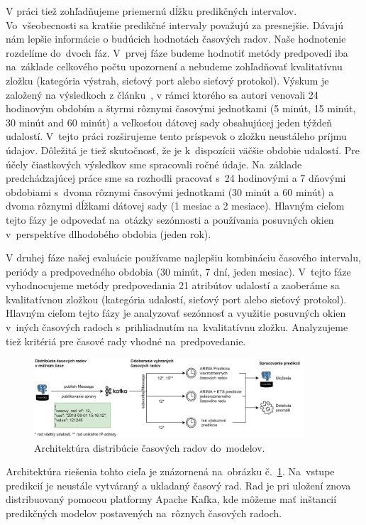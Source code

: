 \documentclass[thesismargins, thesislinespacing, openright, upjsfrontpage]{rnthesis}
\begin{document}
V práci tiež zohľadňujeme priemernú dĺžku predikčných intervalov. Vo~všeobecnosti sa kratšie predikčné intervaly považujú za presnejšie. Dávajú nám lepšie informácie o budúcich hodnotách časových radov. Naše hodnotenie rozdelíme do~dvoch fáz. V~prvej fáze budeme hodnotiť metódy predpovedí iba na~základe celkového počtu upozornení a nebudeme zohľadňovať kvalitatívnu zložku (kategória výstrah, sieťový port alebo sieťový protokol).  Výskum je založený na výsledkoch z článku~\cite{new_paper}, v rámci ktorého sa autori venovali 24 hodinovým obdobím a štyrmi rôznymi časovými jednotkami (5 minút, 15 minút, 30 minút and 60 minút) a veľkosťou dátovej sady obsahujúcej jeden týždeň udalostí. V~tejto práci rozširujeme tento príspevok o zložku neustáleho príjmu údajov. Dôležitá je tiež skutočnosť, že je k~dispozícii väčšie obdobie udalostí. Pre účely čiastkových výsledkov sme spracovali ročné údaje. Na~základe predchádzajúcej práce sme sa rozhodli pracovať s~24 hodinovými a 7 dňovými obdobiami s~dvoma rôznymi časovými jednotkami (30 minút a 60 minút) a dvoma rôznymi dĺžkami dátovej sady (1 mesiac a 2 mesiace). Hlavným cieľom tejto fázy je odpovedať na~otázky sezónnosti a používania posuvných okien v~perspektíve dlhodobého obdobia (jeden rok).

V druhej fáze našej evaluácie používame najlepšiu kombináciu časového intervalu, periódy a predpovedného obdobia (30 minút, 7 dní, jeden mesiac). V~tejto fáze vyhodnocujeme metódy predpovedania 21 atribútov udalostí a zaoberáme sa kvalitatívnou zložkou (kategória udalostí, sieťový port alebo sieťový protokol). Hlavným cieľom tejto fázy je analyzovať sezónnosť a využitie posuvných okien v~iných časových radoch s~prihliadnutím na~kvalitatívnu zložku. Analyzujeme tiež kritériá pre časové rady vhodné na~predpovedanie.

\begin{figure}[h]
  \centering
  \includegraphics[width=0.9\textwidth]{images/metodologia2.png}
  \caption{Architektúra distribúcie časových radov do~modelov.}
  \label{fig:c2_schema}
\end{figure}


Architektúra riešenia tohto cieľa je znázornená na~obrázku č.~\ref{fig:c2_schema}. Na~vstupe predikcií je neustále vytváraný a ukladaný časový rad. Rad je pri uložení znova distribuovaný pomocou platformy Apache Kafka, kde môžeme mať inštancií predikčných modelov postavených na~rôznych časových radoch.
\end{document}
